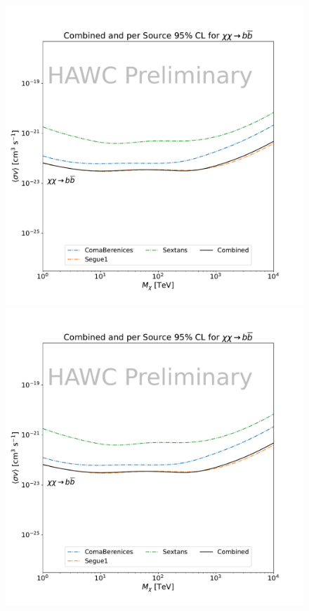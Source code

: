 \begin{figure}[h]
{    \includegraphics[scale=0.21]{figures/mtd_hawc_dm/results/Combined95_New_duck_bb_.pdf}
    \includegraphics[scale=0.21]{figures/mtd_hawc_dm/results/Combined95_New_duck_bb_.pdf}
}
\end{figure}
